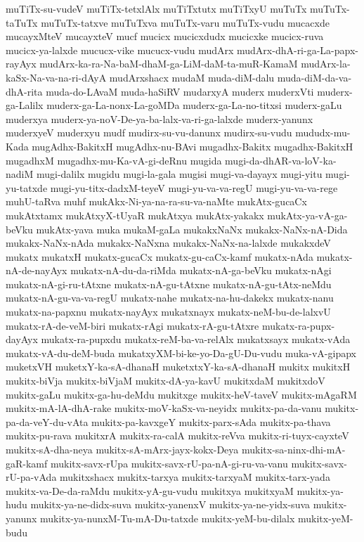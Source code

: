 {muTiTx-su-vudeV
muTiTx-tetxlAlx
muTiTxtutx
muTiTxyU
muTuTx
muTuTx-taTuTx
muTuTx-tatxve
muTuTxva
muTuTx-varu
muTuTx-vudu
mucacxde
mucayxMteV
mucayxteV
mucf
mucicx
mucicxdudx
mucicxke
mucicx-ruva
mucicx-ya-lalxde
mucucx-vike
mucucx-vudu
mudArx
mudArx-dhA-ri-ga-La-papx-rayAyx
mudArx-ka-ra-Na-baM-dhaM-ga-LiM-daM-ta-muR-KamaM
mudArx-la-kaSx-Na-va-na-ri-dAyA
mudArxshacx
mudaM
muda-diM-dalu
muda-diM-da-va-dhA-rita
muda-do-LAvaM
muda-haSiRV
mudarxyA
muderx
muderxVti
muderx-ga-Lalilx
muderx-ga-La-nonx-La-goMDa
muderx-ga-La-no-titxsi
muderx-gaLu
muderxya
muderx-ya-noV-De-ya-ba-lalx-va-ri-ga-lalxde
muderx-yanunx
muderxyeV
muderxyu
mudf
mudirx-su-vu-danunx
mudirx-su-vudu
mududx-mu-Kada
mugAdhx-BakitxH
mugAdhx-nu-BAvi
mugadhx-Bakitx
mugadhx-BakitxH
mugadhxM
mugadhx-mu-Ka-vA-gi-deRnu
mugida
mugi-da-dhAR-va-loV-ka-nadiM
mugi-dalilx
mugidu
mugi-la-gala
mugisi
mugi-va-dayayx
mugi-yitu
mugi-yu-tatxde
mugi-yu-titx-dadxM-teyeV
mugi-yu-va-va-regU
mugi-yu-va-va-rege
muhU-taRva
muhf
mukAkx-Ni-ya-na-ra-su-va-naMte
mukAtx-gucaCx
mukAtxtamx
mukAtxyX-tUyaR
mukAtxya
mukAtx-yakakx
mukAtx-ya-vA-ga-beVku
mukAtx-yava
muka
mukaM-gaLa
mukakxNaNx
mukakx-NaNx-nA-Dida
mukakx-NaNx-nAda
mukakx-NaNxna
mukakx-NaNx-na-lalxde
mukakxdeV
mukatx
mukatxH
mukatx-gucaCx
mukatx-gu-caCx-kamf
mukatx-nAda
mukatx-nA-de-nayAyx
mukatx-nA-du-da-riMda
mukatx-nA-ga-beVku
mukatx-nAgi
mukatx-nA-gi-ru-tAtxne
mukatx-nA-gu-tAtxne
mukatx-nA-gu-tAtx-neMdu
mukatx-nA-gu-va-va-regU
mukatx-nahe
mukatx-na-hu-dakekx
mukatx-nanu
mukatx-na-papxnu
mukatx-nayAyx
mukatxnayx
mukatx-neM-bu-de-lalxvU
mukatx-rA-de-veM-biri
mukatx-rAgi
mukatx-rA-gu-tAtxre
mukatx-ra-pupx-dayAyx
mukatx-ra-pupxdu
mukatx-reM-ba-va-relAlx
mukatxsayx
mukatx-vAda
mukatx-vA-du-deM-buda
mukatxyXM-bi-ke-yo-Da-gU-Du-vudu
muka-vA-gipapx
muketxVH
muketxY-ka-sA-dhanaH
muketxtxY-ka-sA-dhanaH
mukitx
mukitxH
mukitx-biVja
mukitx-biVjaM
mukitx-dA-ya-kavU
mukitxdaM
mukitxdoV
mukitx-gaLu
mukitx-ga-hu-deMdu
mukitxge
mukitx-heV-taveV
mukitx-mAgaRM
mukitx-mA-lA-dhA-rake
mukitx-moV-kaSx-va-neyidx
mukitx-pa-da-vanu
mukitx-pa-da-veY-du-vAta
mukitx-pa-kavxgeY
mukitx-parx-sAda
mukitx-pa-thava
mukitx-pu-rava
mukitxrA
mukitx-ra-calA
mukitx-reVva
mukitx-ri-tuyx-cayxteV
mukitx-sA-dha-neya
mukitx-sA-mArx-jayx-kokx-Deya
mukitx-sa-ninx-dhi-mA-gaR-kamf
mukitx-savx-rUpa
mukitx-savx-rU-pa-nA-gi-ru-va-vanu
mukitx-savx-rU-pa-vAda
mukitxshacx
mukitx-tarxya
mukitx-tarxyaM
mukitx-tarx-yada
mukitx-va-De-da-raMdu
mukitx-yA-gu-vudu
mukitxya
mukitxyaM
mukitx-ya-hudu
mukitx-ya-ne-didx-suva
mukitx-yanenxV
mukitx-ya-ne-yidx-suva
mukitx-yanunx
mukitx-ya-nunxM-Tu-mA-Du-tatxde
mukitx-yeM-bu-dilalx
mukitx-yeM-budu
}
